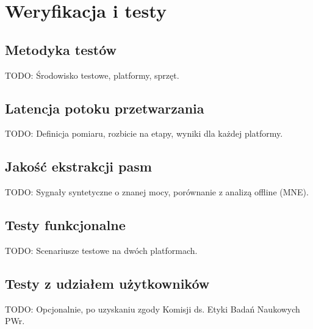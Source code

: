 \chapter{Weryfikacja i testy}
\label{chapt:Weryfikacja}

\section{Metodyka testów}
TODO: Środowisko testowe, platformy, sprzęt.

\section{Latencja potoku przetwarzania}
TODO: Definicja pomiaru, rozbicie na etapy, wyniki dla każdej platformy.

\section{Jakość ekstrakcji pasm}
TODO: Sygnały syntetyczne o znanej mocy, porównanie z analizą offline (MNE).

\section{Testy funkcjonalne}
TODO: Scenariusze testowe na dwóch platformach.

\section{Testy z udziałem użytkowników}
TODO: Opcjonalnie, po uzyskaniu zgody Komisji ds. Etyki Badań Naukowych PWr.

